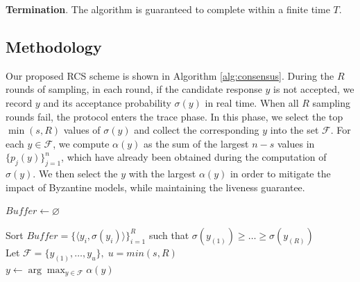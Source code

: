 \noindent
\textbf{Termination}. 
The algorithm is guaranteed to complete within a finite time $T$.


\subsection{Methodology}
Our proposed RCS scheme is shown in Algorithm \ref{alg:consensus}. During the $R$ rounds of sampling, in each round, if the candidate response $y$ is not accepted, we record $y$ and its acceptance probability $\sigma(y)$ in real time. When all $R$ sampling rounds fail, the protocol enters the trace phase. In this phase, we select the top $\min(s, R)$ values of $\sigma(y)$ and collect the corresponding $y$ into the set $\mathcal{F}$. For each $y \in \mathcal{F}$, we compute $\alpha(y)$ as the sum of the largest $n - s$ values in $\{p_j(y)\}_{j=1}^{n}$, which have already been obtained during the computation of $\sigma(y)$. We then select the $y$ with the largest $\alpha(y)$ in order to mitigate the impact of Byzantine models, while maintaining the liveness guarantee.


\begin{algorithm}[t]
\SetAlgoLined
{}

$Buffer \gets \varnothing$\\

Sort $Buffer=\{\langle y_i, \sigma(y_i) \rangle \}_{i=1}^{R}$ 
 such that $\sigma(y_{(1)}) \ge \dots \ge \sigma(y_{(R)})$\\
Let $\mathcal{F} = \{y_{(1)}, \dots, y_{u}\}, \; u= min(s,R)$ \\
\Return $y \gets \arg\max_{y \in \mathcal{F}} \alpha(y)$

\caption{Reliable Consensus Sampling Algorithm}
\label{alg:consensus}
\end{algorithm}



